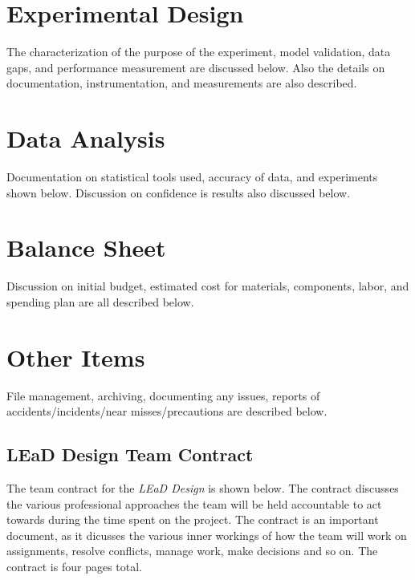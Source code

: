 \documentclass[12pt]{article}
\begin{document}
	\newpage

\section{Experimental Design}
	The characterization of the purpose of the experiment, model validation, data gaps, and performance measurement are discussed below. Also the details on documentation, instrumentation, and measurements are also described.
  	
	\newpage	
  	
\section{Data Analysis}
	Documentation on statistical tools used, accuracy of data, and experiments shown below. Discussion on confidence is results also discussed below.

	\newpage

\section{Balance Sheet}
	Discussion on initial budget, estimated cost for materials, components, labor, and spending plan are all described below.

	\newpage

\section{Other Items}
	File management, archiving, documenting any issues, reports of accidents/incidents/near misses/precautions are described below. 
	
	\subsection{LEaD Design Team Contract}
	The team contract for the \textit{LEaD Design} is shown below. The contract discusses the various professional approaches the team will be held accountable to act towards during the time spent on the project. The contract is an important document, as it dicusses the various inner workings of how the team will work on assignments, resolve conflicts, manage work, make decisions and so on. The contract is four pages total.
	
		
\end{document}
